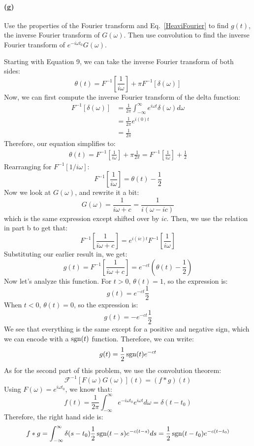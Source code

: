 \documentclass{article}
\begin{document}
\paragraph{(g)}
Use the properties of the Fourier transform and Eq.~\ref{HeaviFourier} to find $g(t)$, the inverse Fourier transform of $G(\omega)$.  Then
use convolution to find the inverse Fourier transform of $e^{-i\omega t_{0}}G(\omega)$.  

\begin{solution}
	Starting with Equation 9, we can take the inverse Fourier transform of both sides:
	\[
		\theta(t) = F^{-1} \left[\frac{1}{i \omega}\right] + \pi F^{-1}[\delta(\omega)]
	\]
	Now, we can first compute the inverse Fourier transform of the delta function:
	\begin{align*}
		F^{-1}[\delta(\omega)] &= \frac{1}{2\pi}\int_{-\infty}^\infty e^{i \omega t} \delta(\omega) d\omega \\
							   &= \frac{1}{2\pi} e^{i(0) t}  \\
							   &= \frac{1}{2\pi} 
	\end{align*}
	Therefore, our equation simplifies to:
	\begin{align*}
		\theta(t) = F^{-1}\left[\frac{1}{i \omega}\right] + \pi \frac{1}{2\pi }  = F^{-1}\left[ \frac{1}{i \omega}\right] + \frac{1}{2}
	\end{align*}
	Rearranging for $F^{-1}[1 / i \omega]$:
	\[
		F^{-1} \left[ \frac{1}{i \omega}\right] = \theta(t) - \frac{1}{2}
	\] 
	Now we look at $G(\omega)$, and rewrite it a bit:
	\[
		G(\omega) = \frac{1}{i \omega + c} = \frac{1}{i(\omega - ic)}
	\] 
	which is the same expression except shifted over by $ic$. Then, we use the relation in part b to 
	get that:
	\[
		F^{-1}\left[\frac{1}{i \omega + c}\right] = e^{i(ic) t} F^{-1}\left[\frac{1}{i \omega}\right]
	\] 
	Substituting our earlier result in, we get:
	\[
		g(t) = F^{-1}\left[\frac{1}{i \omega + c}\right] = e^{-ct}\left(\theta(t)-\frac{1}{2}\right)
	\] 
	Now let's analyze this function. For $t > 0$, $\theta(t) = 1$, so the expression is:
	\[
		g(t) = e^{-ct} \frac{1}{2}
	\] 
	When $t < 0$, $\theta(t) = 0$, so the expression is:
	\[
		g(t) = -e^{-ct}\frac{1}{2}
	\] 
	We see that everything is the same except for a positive and negative sign, which we can encode with 
	a $\operatorname{sgn}(t)$ function. Therefore, we can write:
	\[
		g(t) = \frac{1}{2}\operatorname{sgn}(t) e^{-ct}
	\] 
	As for the second part of this problem, we use the convolution theorem:
	\[
		\mathcal F^{-1}[F(\omega) G(\omega)](t) = (f \ast g)(t)
	\] 
	Using $F(\omega) = e^{i \omega t_0}$, we know that:
	\[
		f(t) = \frac{1}{2\pi}\int_{-\infty}^\infty e^{-i \omega t_0} e^{i \omega t} d\omega = \delta(t - t_0)
	\] 
	Therefore, the right hand side is:
	\[
		f \ast g = \int_{-\infty}^{\infty} \delta(s - t_0) \frac{1}{2}\operatorname{sgn}(t - s)e^{-c(t-s)} ds = \frac{1}{2}\operatorname{sgn}(t - t_0)e^{-c(t - t_0)}
	\] 
\end{solution}
\end{document}
